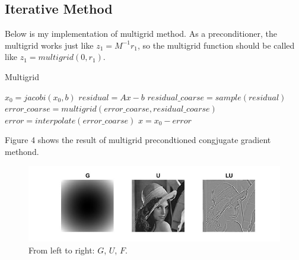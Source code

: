 \documentclass{article}
\begin{document}
\subsection{Iterative Method}
Below is my implementation of multigrid method. As a preconditioner, the multigrid works just like $z_1=M^{-1}r_1$, so the multigrid function should be called like $z_1=multigrid(0,r_1)$.
\begin{algorithm}  [H]
\caption{Multigrid}\label{algo1}
    \begin{algorithmic}
                
                    \State $x_0=jacobi(x_0,b)$ 
                \EndFor
                \State $residual = Ax-b$ 
                \State $residual\_coarse=sample(residual)$ 
                    \State $error\_coarse = multigrid(error\_coarse, residual\_coarse)$
                \EndIf
                \State $error=interpolate(error\_coarse)$ 
                \State $x=x_0-error$ 
                \State {}
            \EndFunction
        \end{algorithmic}  
\end{algorithm} 
Figure 4 shows the result of multigrid precondtioned congjugate gradient methond.
\begin{figure}[H]
   \centering
   \includegraphics[scale=0.8]{cgmg.jpg}
   \caption{From left to right: $G$, $U$, $F$.}
\end{figure}

\newpage
\end{document}
